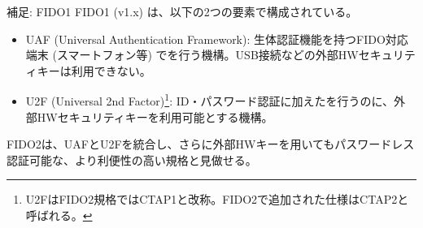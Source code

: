 \documentclass[12pt,dvipdfmx,uplatex]{beamer}
\begin{document}
\begin{frame}
\begin{exampleblock}{\small 補足: FIDO1}
\small
FIDO1 (v1.x) は、以下の2つの要素で構成されている。
\begin{itemize}
 \item UAF (Universal Authentication Framework): 生体認証機能を持つFIDO対応端末 (スマートフォン等) でを行う機構。USB接続などの外部HWセキュリティキーは利用できない。
 \item U2F (Universal 2nd Factor)\footnote[frame]{\scriptsize U2FはFIDO2規格ではCTAP1と改称。FIDO2で追加された仕様はCTAP2と呼ばれる。}: ID・パスワード認証に加えたを行うのに、外部HWセキュリティキーを利用可能とする機構。
\end{itemize}
FIDO2は、UAFとU2Fを統合し、さらに外部HWキーを用いてもパスワードレス認証可能な、より利便性の高い規格と見做せる。
\end{exampleblock}
 
\end{frame}
\end{document}

